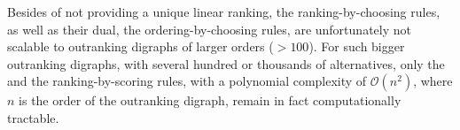 Besides of not providing a unique linear ranking, the ranking-by-choosing rules, as well as their dual, the ordering-by-choosing rules, are unfortunately not scalable to outranking digraphs of larger orders ($> 100$). For such bigger outranking digraphs, with several hundred or thousands of alternatives, only the \Copeland and the \NetFlows ranking-by-scoring rules, with a polynomial complexity of $\mathcal{O}(n^2)$, where $n$ is the order of the outranking digraph, remain in fact computationally tractable.

\clearpage


%